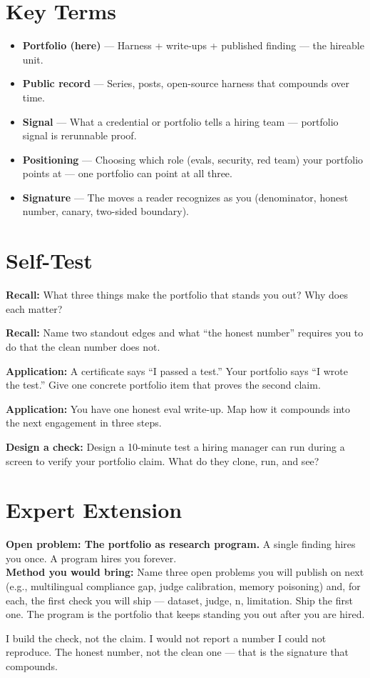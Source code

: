 \section{Key Terms}
\begin{itemize}
\item \textbf{Portfolio (here)} — Harness + write-ups + published finding — the hireable unit.
\item \textbf{Public record} — Series, posts, open-source harness that compounds over time.
\item \textbf{Signal} — What a credential or portfolio tells a hiring team — portfolio signal is rerunnable proof.
\item \textbf{Positioning} — Choosing which role (evals, security, red team) your portfolio points at — one portfolio can point at all three.
\item \textbf{Signature} — The moves a reader recognizes as you (denominator, honest number, canary, two-sided boundary).
\end{itemize}

\section{Self-Test}
\begin{selftest}
\item \textbf{Recall:} What three things make the portfolio that stands you out? Why does each matter?
\item \textbf{Recall:} Name two standout edges and what ``the honest number'' requires you to do that the clean number does not.
\item \textbf{Application:} A certificate says ``I passed a test.'' Your portfolio says ``I wrote the test.'' Give one concrete portfolio item that proves the second claim.
\item \textbf{Application:} You have one honest eval write-up. Map how it compounds into the next engagement in three steps.
\item \textbf{Design a check:} Design a 10-minute test a hiring manager can run during a screen to verify your portfolio claim. What do they clone, run, and see?
\end{selftest}


\section{Expert Extension}
\rbadge
\textbf{Open problem: The portfolio as research program.} A single finding hires you once. A program hires you forever.\\
\textbf{Method you would bring:} Name three open problems you will publish on next (e.g., multilingual compliance gap, judge calibration, memory poisoning) and, for each, the first check you will ship — dataset, judge, n, limitation. Ship the first one. The program is the portfolio that keeps standing you out after you are hired.

\begin{checkbox}
I build the check, not the claim. I would not report a number I could not reproduce. The honest number, not the clean one — that is the signature that compounds.
\end{checkbox}
